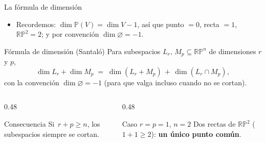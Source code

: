 \documentclass[aspectratio=169]{beamer}
\newcommand{\RP}{\mathbb{RP}}
\begin{document}
\begin{frame}{La fórmula de dimensión}
  \begin{itemize}
    \item Recordemos: $\dim\mathbb P(V)=\dim V-1$, así que punto $=0$, \;
          recta $=1$, \; $\RP^2=2$; \; y por convención $\dim\varnothing=-1$.
  \end{itemize}
  \vspace{0.1cm}
  \begin{block}{Fórmula de dimensión (Santaló)}
    Para subespacios $L_r,\,M_p \subseteq \RP^n$ de dimensiones $r$ y $p$,
    \[
      \dim L_r + \dim M_p \;=\; \dim(L_r + M_p) \,+\, \dim(L_r \cap M_p),
    \]
    con la convención $\dim\varnothing=-1$ (para que valga incluso cuando
    no se cortan).
  \end{block}
  \vspace{0.1cm}
  \begin{columns}[T]
    \begin{column}{0.48\textwidth}
      \begin{block}{Consecuencia}
        Si $\,r+p \ge n$, los subespacios \alert{siempre se cortan}.
      \end{block}
    \end{column}
    \begin{column}{0.48\textwidth}
      \begin{block}{Caso $r=p=1$, $n=2$}
        Dos rectas de $\RP^2$ ($1+1\ge 2$): \textbf{un único punto común}.
      \end{block}
    \end{column}
  \end{columns}
\end{frame}
\end{document}
